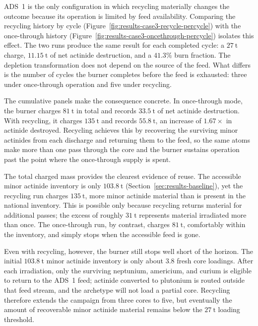 ADS~1 is the only configuration in which recycling materially changes the
outcome because its operation is limited by feed availability. Comparing the
recycling history by cycle (Figure~\ref{fig:results-case3-recycle-percycle}) with
the once-through history (Figure~\ref{fig:results-case3-oncethrough-percycle})
isolates this effect. The two runs produce the same result for each completed
cycle: a \(27~\mathrm{t}\) charge, \(11.15~\mathrm{t}\) of net actinide
destruction, and a \(41.3\%\) burn fraction. The depletion transformation does
not depend on the source of the feed. What differs is the number of cycles the
burner completes before the feed is exhausted: three under once-through
operation and five under recycling.

The cumulative panels make the consequence concrete. In once-through mode, the
burner charges \(81~\mathrm{t}\) in total and records
\(33.5~\mathrm{t}\) of net actinide destruction. With recycling, it charges
\(135~\mathrm{t}\) and records \(55.8~\mathrm{t}\), an increase of
\(1.67\times\) in actinide destroyed. Recycling achieves this by
recovering the surviving minor actinides from each discharge and returning them to
the feed, so the same atoms make more than one pass through the core and the
burner sustains operation past the point where the once-through supply is spent.

The total charged mass provides the clearest evidence of reuse. The accessible
minor actinide inventory is only \(103.8~\mathrm{t}\)
(Section~\ref{sec:results-baseline}), yet the recycling run charges
\(135~\mathrm{t}\), more minor actinide material than is present in the national
inventory. This is possible only because recycling returns material for
additional passes; the excess of roughly \(31~\mathrm{t}\) represents material
irradiated more than once. The once-through run, by contrast, charges \(81~\mathrm{t}\), comfortably
within the inventory, and simply stops when the accessible feed is gone.

Even with recycling, however, the burner still stops well short of the horizon.
The initial \(103.8~\mathrm{t}\) minor actinide inventory is only about
\(3.8\) fresh core loadings. After each irradiation, only the surviving
neptunium, americium, and curium is eligible to return to the ADS~1 feed; actinide
converted to plutonium is routed outside that feed stream, and the archetype will
not load a partial core. Recycling therefore extends the campaign from three
cores to five, but eventually the amount of recoverable minor actinide material
remains below the \(27~\mathrm{t}\) loading threshold.

